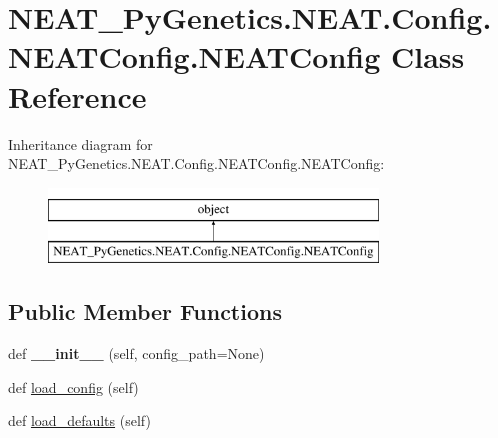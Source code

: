 \hypertarget{class_n_e_a_t___py_genetics_1_1_n_e_a_t_1_1_config_1_1_n_e_a_t_config_1_1_n_e_a_t_config}{}\section{N\+E\+A\+T\+\_\+\+Py\+Genetics.\+N\+E\+A\+T.\+Config.\+N\+E\+A\+T\+Config.\+N\+E\+A\+T\+Config Class Reference}
\label{class_n_e_a_t___py_genetics_1_1_n_e_a_t_1_1_config_1_1_n_e_a_t_config_1_1_n_e_a_t_config}
Inheritance diagram for N\+E\+A\+T\+\_\+\+Py\+Genetics.\+N\+E\+A\+T.\+Config.\+N\+E\+A\+T\+Config.\+N\+E\+A\+T\+Config\+:\begin{figure}[H]
\begin{center}
\leavevmode
\includegraphics[height=2.000000cm]{class_n_e_a_t___py_genetics_1_1_n_e_a_t_1_1_config_1_1_n_e_a_t_config_1_1_n_e_a_t_config}
\end{center}
\end{figure}
\subsection*{Public Member Functions}
\begin{DoxyCompactItemize}
\item 
def {\bfseries \+\_\+\+\_\+init\+\_\+\+\_\+} (self, config\+\_\+path=None)\hypertarget{class_n_e_a_t___py_genetics_1_1_n_e_a_t_1_1_config_1_1_n_e_a_t_config_1_1_n_e_a_t_config_a88504e0a5c56f166a3ee5898ae3e0dea}{}\label{class_n_e_a_t___py_genetics_1_1_n_e_a_t_1_1_config_1_1_n_e_a_t_config_1_1_n_e_a_t_config_a88504e0a5c56f166a3ee5898ae3e0dea}

\item 
def \hyperlink{class_n_e_a_t___py_genetics_1_1_n_e_a_t_1_1_config_1_1_n_e_a_t_config_1_1_n_e_a_t_config_aa6843226e3a017a384c8244f4e62e0f5}{load\+\_\+config} (self)
\item 
def \hyperlink{class_n_e_a_t___py_genetics_1_1_n_e_a_t_1_1_config_1_1_n_e_a_t_config_1_1_n_e_a_t_config_a2669153b4f4160d33477fc89d16dd716}{load\+\_\+defaults} (self)
\end{DoxyCompactItemize}
